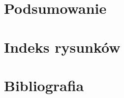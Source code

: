 \documentclass[12pt, a4paper]{article}
\begin{document}
\begin{sloppypar}
{}

\section{Podsumowanie}
{
}

\section{Indeks rysunków}

\section{Bibliografia}
{
  \printbibliography
}

\end{sloppypar}
\end{document}
